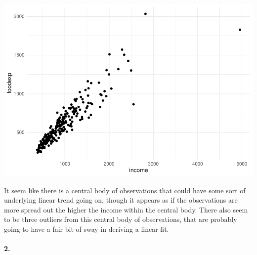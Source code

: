 \documentclass[
]{article}
\newenvironment{Shaded}{\begin{snugshade}}{\end{snugshade}}
\newcommand{\CommentTok}[1]{\textcolor[rgb]{0.56,0.35,0.01}{\textit{#1}}}
\newcommand{\DataTypeTok}[1]{\textcolor[rgb]{0.13,0.29,0.53}{#1}}
\newcommand{\DecValTok}[1]{\textcolor[rgb]{0.00,0.00,0.81}{#1}}
\newcommand{\KeywordTok}[1]{\textcolor[rgb]{0.13,0.29,0.53}{\textbf{#1}}}
\newcommand{\NormalTok}[1]{#1}
\newcommand{\OperatorTok}[1]{\textcolor[rgb]{0.81,0.36,0.00}{\textbf{#1}}}
\newcommand{\StringTok}[1]{\textcolor[rgb]{0.31,0.60,0.02}{#1}}
\begin{document}
\begin{Shaded}
\end{Shaded}

\begin{center}\includegraphics{matstatproblems20-21_files/figure-latex/unnamed-chunk-76-1} \end{center}

It seem like there is a central body of observations that could have
some sort of underlying linear trend going on, though it appears as if
the observations are more spread out the higher the income within the
central body. There also seem to be three outliers from this central
body of observations, that are probably going to have a fair bit of sway
in deriving a linear fit.

\hypertarget{section-73}{%
\paragraph{\texorpdfstring{\textbf{2.}}{2.}}\label{section-73}}
\end{document}

